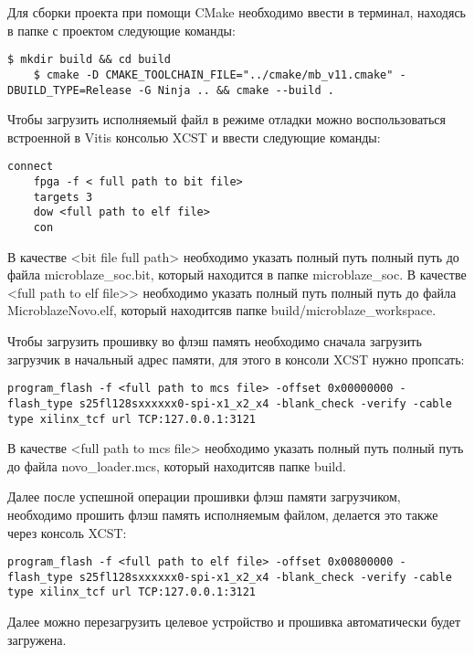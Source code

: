 Для сборки проекта при помощи CMake необходимо ввести в терминал, находясь в папке с проектом следующие команды:

\begin{lstlisting}[basicstyle=\ttfamily\small]
    $ mkdir build && cd build
    $ cmake -D CMAKE_TOOLCHAIN_FILE="../cmake/mb_v11.cmake" -DBUILD_TYPE=Release -G Ninja .. && cmake --build .
\end{lstlisting}

Чтобы загрузить исполняемый файл в режиме отладки можно воспользоваться встроенной в Vitis консолью XCST и ввести следующие команды:

\begin{lstlisting}[basicstyle=\ttfamily\small]
    connect
    fpga -f < full path to bit file>
    targets 3
    dow <full path to elf file>
    con
\end{lstlisting}

В качестве <bit file full path> необходимо указать полный путь полный путь до файла microblaze\_soc.bit, который находится в папке microblaze\_soc.
В качестве <full path to elf file>> необходимо указать полный путь полный путь до файла MicroblazeNovo.elf, который находитсяв папке build/microblaze\_workspace.

Чтобы загрузить прошивку во флэш память необходимо сначала загрузить загрузчик в начальный адрес памяти, для этого в консоли XCST нужно пропсать:

\begin{lstlisting}[basicstyle=\ttfamily\small]
    program_flash -f <full path to mcs file> -offset 0x00000000 -flash_type s25fl128sxxxxxx0-spi-x1_x2_x4 -blank_check -verify -cable type xilinx_tcf url TCP:127.0.0.1:3121
\end{lstlisting}

В качестве <full path to mcs file> необходимо указать полный путь полный путь до файла novo\_loader.mcs, который находитсяв папке build.

Далее после успешной операции прошивки флэш памяти загрузчиком, необходимо прошить флэш память исполняемым файлом, делается это также через консоль XCST: 

\begin{lstlisting}[basicstyle=\ttfamily\small]
    program_flash -f <full path to elf file> -offset 0x00800000 -flash_type s25fl128sxxxxxx0-spi-x1_x2_x4 -blank_check -verify -cable type xilinx_tcf url TCP:127.0.0.1:3121
\end{lstlisting}

Далее можно перезагрузить целевое устройство и прошивка автоматически будет загружена. 

